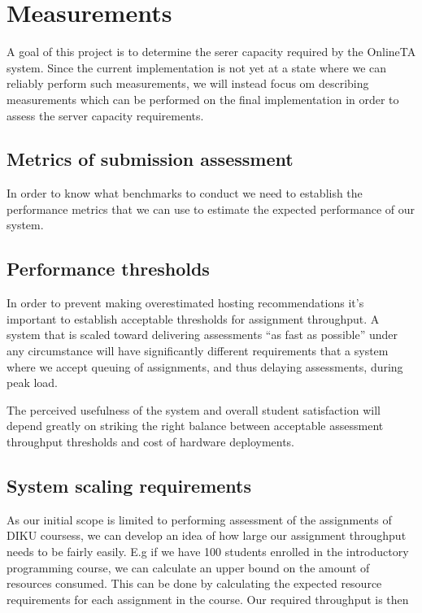 \chapter{Measurements}
A goal of this project is to determine the serer capacity required by
the OnlineTA system. Since the current implementation is not yet at a
state where we can reliably perform such measurements, we will instead
focus om describing measurements which can be performed on the final
implementation in order to assess the server capacity requirements.


\section{Metrics of submission assessment}
In order to know what benchmarks to conduct we need to establish the
performance metrics that we can use to estimate the expected
performance of our system.



\section{Performance thresholds}
In order to prevent making overestimated hosting recommendations it's
important to establish acceptable thresholds for assignment
throughput. A system that is scaled toward delivering assessments "`as
fast as possible"' under any circumstance will have significantly
different requirements that a system where we accept queuing of
assignments, and thus delaying assessments, during peak load.

The perceived usefulness of the system and overall student
satisfaction will depend greatly on striking the right balance between
acceptable assessment throughput thresholds and cost of hardware
deployments.

\section{System scaling requirements}
As our initial scope is limited to performing assessment of
the assignments of DIKU coursess, we can develop an
idea of how large our assignment throughput needs to be fairly easily. E.g if we
have 100 students enrolled in the introductory programming course, we
can calculate an upper bound on the amount of resources
consumed. This can be done by calculating the expected resource
requirements for each assignment in the course. Our required
throughput is then 

